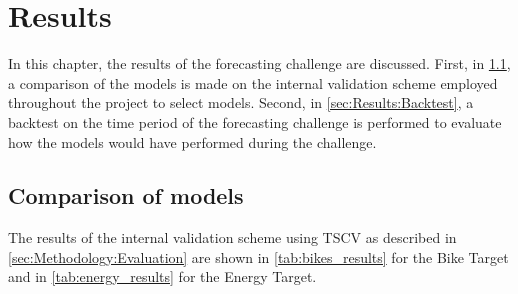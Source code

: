 \newpage
\section{Results}
\label{ch:Results}

In this chapter, the results of the forecasting challenge are discussed. First, in \cref{sec:Results:ComparisonModels}, a comparison of the models is made on the internal validation scheme employed throughout the project to select models. Second, in \cref{sec:Results:Backtest}, a backtest on the time period of the forecasting challenge is performed to evaluate how the models would have performed during the challenge.

\subsection{Comparison of models}
\label{sec:Results:ComparisonModels}

The results of the internal validation scheme using TSCV as described in \cref{sec:Methodology:Evaluation} are shown in \cref{tab:bikes_results} for the Bike Target and in \cref{tab:energy_results} for the Energy Target. 

\begin{table}[htp]
\centering
{}
\caption{Results of Timeseries Cross-Validation on the Bike Target for the full year 2024 with weekly shifting of sliding windows. Best values are highlighted in bold. \textit{Pinball Loss} refers to the sum of the pinball losses for all quantile levels, averaged over the folds in the TSCV (cf. \cref{sec:Methodology:Evaluation})}
\label{tab:bikes_results}
\end{table}

